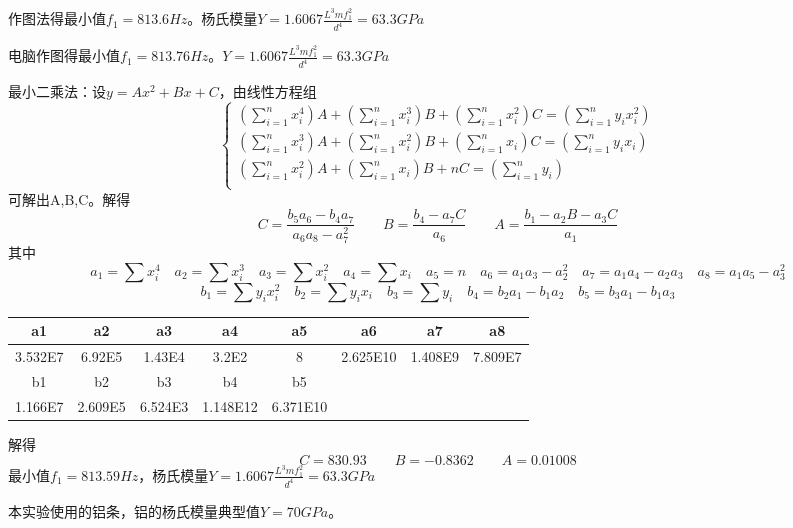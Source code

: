 \documentclass[11pt]{article}
\begin{document}
\par 作图法得最小值$f_1=813.6Hz$。杨氏模量$Y=1.6067\frac{L^3mf_1^2}{d^4}=63.3GPa$
\par 电脑作图得最小值$f_1=813.76Hz$。$Y=1.6067\frac{L^3mf_1^2}{d^4}=63.3GPa$
\par 最小二乘法：设$y=Ax^2+Bx+C$，由线性方程组
\begin{equation}
    \begin{cases}
        \left(\sum\limits_{i=1}^{n}x_i^4\right)A+\left(\sum\limits_{i=1}^{n} x_i^3\right)B+\left(\sum\limits_{i=1}^{n} x_i^2\right)C= \left(\sum\limits_{i=1}^{n} y_i x_i^2\right) \\
        \left(\sum\limits_{i=1}^{n} x_i^3\right)A+\left(\sum\limits_{i=1}^{n} x_i^2\right)B+\left(\sum\limits_{i=1}^{n} x_i\right)C= \left(\sum\limits_{i=1}^{n} y_i x_i\right) \\
        \left(\sum\limits_{i=1}^{n} x_i^2\right)A+\left(\sum\limits_{i=1}^{n} x_i\right)B+nC= \left(\sum\limits_{i=1}^{n} y_i\right) \\
    \end{cases}
\end{equation}
可解出A,B,C。解得
\begin{equation}
    C=\frac{b_5a_6-b_4a_7}{a_6a_8-a_7^2}
    \qquad B=\frac{b_4-a_7C}{a_6}
    \qquad A=\frac{b_1-a_2B-a_3C}{a_1}
\end{equation}
其中
\[a_1=\sum x_i^4 \quad a_2=\sum x_i^3 \quad a_3=\sum x_i^2 \quad a_4=\sum  x_i \quad a_5=n \quad a_6=a_1a_3-a_2^2 \quad a_7=a_1a_4-a_2a_3 \quad a_8=a_1a_5-a_3^2\]
\[b_1=\sum y_i x_i^2 \quad b_2=\sum y_i x_i \quad b_3=\sum y_i \quad b_4=b_2a_1-b_1a_2 \quad b_5=b_3a_1-b_1a_3\]
\begin{table}[H]
    \centering
    \begin{tabular}{|c|c|c|c|c|c|c|c|}
    \hline
        a1 & a2 & a3 & a4 & a5 & a6 & a7 & a8 \\ \hline
        3.532E7 & 6.92E5 & 1.43E4 & 3.2E2 & 8 & 2.625E10 & 1.408E9 & 7.809E7 \\ \hline
        b1 & b2 & b3 & b4 & b5 & ~ & ~ & ~ \\ \hline
        1.166E7 & 2.609E5 & 6.524E3 & 1.148E12 & 6.371E10 & ~ & ~ & ~\\ \hline
    \end{tabular}
\end{table}
解得\[C=830.93\qquad B=-0.8362 \qquad A=0.01008\]%
最小值$f_1=813.59Hz$，杨氏模量$Y=1.6067\frac{L^3mf_1^2}{d^4}=63.3GPa$
\par 本实验使用的铝条，铝的杨氏模量典型值$Y=70GPa$。
\end{document}
